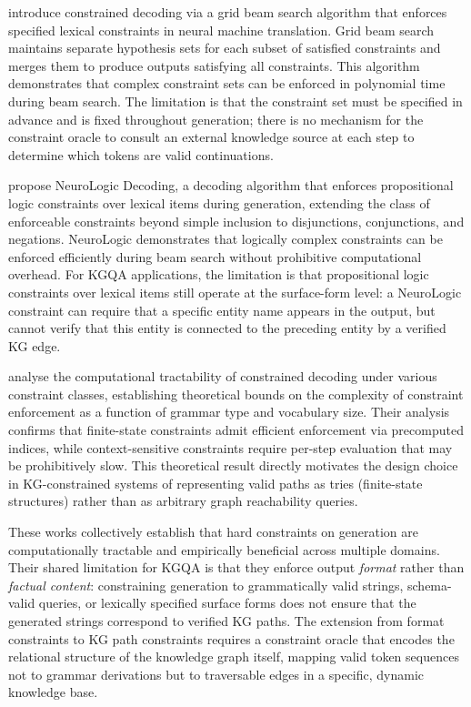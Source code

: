 \citet{hokamp2017lexically} introduce constrained decoding via a grid beam search algorithm that enforces specified lexical constraints in neural machine translation. Grid beam search maintains separate hypothesis sets for each subset of satisfied constraints and merges them to produce outputs satisfying all constraints. This algorithm demonstrates that complex constraint sets can be enforced in polynomial time during beam search. The limitation is that the constraint set must be specified in advance and is fixed throughout generation; there is no mechanism for the constraint oracle to consult an external knowledge source at each step to determine which tokens are valid continuations.

\citet{lu2021neurologic} propose NeuroLogic Decoding, a decoding algorithm that enforces propositional logic constraints over lexical items during generation, extending the class of enforceable constraints beyond simple inclusion to disjunctions, conjunctions, and negations. NeuroLogic demonstrates that logically complex constraints can be enforced efficiently during beam search without prohibitive computational overhead. For KGQA applications, the limitation is that propositional logic constraints over lexical items still operate at the surface-form level: a NeuroLogic constraint can require that a specific entity name appears in the output, but cannot verify that this entity is connected to the preceding entity by a verified KG edge.

\citet{zhang2023tractable} analyse the computational tractability of constrained decoding under various constraint classes, establishing theoretical bounds on the complexity of constraint enforcement as a function of grammar type and vocabulary size. Their analysis confirms that finite-state constraints admit efficient enforcement via precomputed indices, while context-sensitive constraints require per-step evaluation that may be prohibitively slow. This theoretical result directly motivates the design choice in KG-constrained systems of representing valid paths as tries (finite-state structures) rather than as arbitrary graph reachability queries.

These works collectively establish that hard constraints on generation are computationally tractable and empirically beneficial across multiple domains. Their shared limitation for KGQA is that they enforce output \textit{format} rather than \textit{factual content}: constraining generation to grammatically valid strings, schema-valid queries, or lexically specified surface forms does not ensure that the generated strings correspond to verified KG paths. The extension from format constraints to KG path constraints requires a constraint oracle that encodes the relational structure of the knowledge graph itself, mapping valid token sequences not to grammar derivations but to traversable edges in a specific, dynamic knowledge base.

